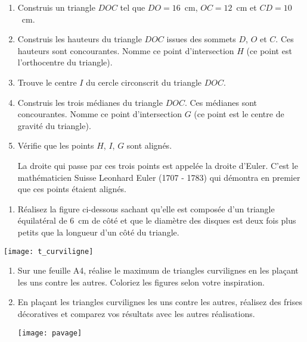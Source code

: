 
\begin{TP}

\begin{enumerate}
\item Construis un triangle $DOC$ tel que $DO = 16$ cm, $OC = 12$ cm et $CD = 10$ cm.
\item Construis les hauteurs du triangle $DOC$ issues des sommets $D$, $O$ et $C$. Ces hauteurs sont concourantes. Nomme ce point d'intersection $H$ (ce point est l'orthocentre du triangle).
\item Trouve le centre $I$ du cercle circonscrit du triangle $DOC$.
\item Construis les trois médianes du triangle $DOC$. Ces médianes sont concourantes. Nomme ce point d'intersection $G$ (ce point est le centre de gravité du triangle).
\item Vérifie que les points $H$, $I$, $G$ sont alignés.

La droite qui passe par ces trois points est appelée la droite d'Euler. C'est le mathématicien Suisse Leonhard Euler (1707 - 1783) qui démontra en premier que ces points étaient alignés.
\end{enumerate}

\end{TP}


\begin{TP}


\begin{enumerate}
 \item Réalisez la figure ci-dessous sachant qu'elle est composée d'un triangle équilatéral de 6 cm de côté et que le diamètre des disques est deux fois plus petits que la longueur d'un côté du triangle.
 \end{enumerate}
 
 \begin{center} \texttt{[image: t\_curviligne]} \end{center}


\begin{enumerate}
 \item Sur une feuille A4, réalise le maximum de triangles curvilignes en les plaçant les uns contre les autres. Coloriez les figures selon votre inspiration.
 \item En plaçant les triangles curvilignes les uns contre les autres, réalisez des frises décoratives et comparez vos résultats avec les autres réalisations.
 
 \begin{center} \texttt{[image: pavage]} \end{center}

 \end{enumerate}

\end{TP}

